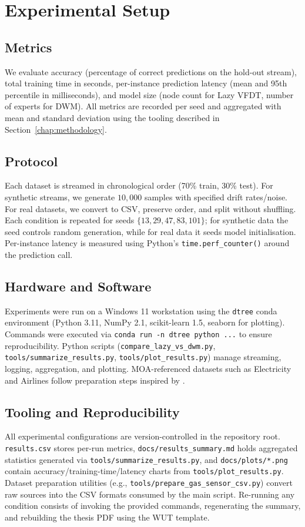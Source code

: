 \cleardoublepage
\chapter{Experimental Setup}
\label{chap:setup}

\section{Metrics}
We evaluate accuracy (percentage of correct predictions on the hold-out stream), total training time in seconds, per-instance prediction latency (mean and 95th percentile in milliseconds), and model size (node count for Lazy VFDT, number of experts for DWM). All metrics are recorded per seed and aggregated with mean and standard deviation using the tooling described in Section~\ref{chap:methodology}.

\section{Protocol}
Each dataset is streamed in chronological order (70\% train, 30\% test). For synthetic streams, we generate $10{,}000$ samples with specified drift rates/noise. For real datasets, we convert to CSV, preserve order, and split without shuffling. Each condition is repeated for seeds $\{13, 29, 47, 83, 101\}$; for synthetic data the seed controls random generation, while for real data it seeds model initialisation. Per-instance latency is measured using Python's \texttt{time.perf\_counter()} around the prediction call.

\section{Hardware and Software}
Experiments were run on a Windows 11 workstation using the \texttt{dtree} conda environment (Python 3.11, NumPy 2.1, scikit-learn 1.5, seaborn for plotting). Commands were executed via \texttt{conda run -n dtree python ...} to ensure reproducibility. Python scripts (\texttt{compare\_lazy\_vs\_dwm.py}, \texttt{tools/summarize\_results.py}, \texttt{tools/plot\_results.py}) manage streaming, logging, aggregation, and plotting. MOA-referenced datasets such as Electricity and Airlines follow preparation steps inspired by \cite{bifet2010moa}.

\section{Tooling and Reproducibility}
All experimental configurations are version-controlled in the repository root. \texttt{results.csv} stores per-run metrics, \texttt{docs/results\_summary.md} holds aggregated statistics generated via \texttt{tools/summarize\_results.py}, and \texttt{docs/plots/*.png} contain accuracy/training-time/latency charts from \texttt{tools/plot\_results.py}. Dataset preparation utilities (e.g., \texttt{tools/prepare\_gas\_sensor\_csv.py}) convert raw sources into the CSV formats consumed by the main script. Re-running any condition consists of invoking the provided commands, regenerating the summary, and rebuilding the thesis PDF using the WUT template.

